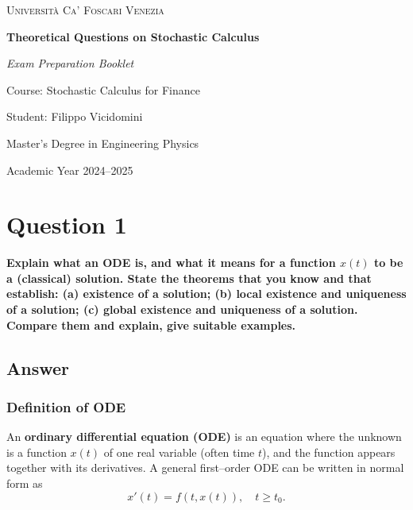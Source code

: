 \documentclass[12pt,a4paper]{book}
\theoremstyle{remark}
\begin{document}
\begin{titlepage}
    \centering
    
    {\scshape Università Ca' Foscari Venezia \par}
 
    \vspace{2cm}
    \vfill
    {\Huge\bfseries Theoretical Questions on Stochastic Calculus \par}
    \vspace{1.5cm}
    {\Large\itshape Exam Preparation Booklet\par}
    
    \vspace{2cm}
    {\Large Course: Stochastic Calculus for Finance \par}
    \vspace{0.5cm}
 
    
    \vfill
    
    {\large Student: Filippo Vicidomini \par}
    {\large Master’s Degree in Engineering Physics\par}
    
    \vfill
    
    {\large Academic Year 2024--2025 \par}
    
\end{titlepage}

\tableofcontents



\newpage
\section{Question 1}
\textbf{Explain what an ODE is, and what it means for a function $x(t)$ to be a (classical) solution. 
State the theorems that you know and that establish: (a) existence of a solution; (b) local existence and uniqueness of a solution; (c) global existence and uniqueness of a solution. 
Compare them and explain, give suitable examples.}

\subsection*{Answer}

\subsubsection*{Definition of ODE}
An \textbf{ordinary differential equation (ODE)} is an equation where the unknown is a function $x(t)$ of one real variable (often time $t$), and the function appears together with its derivatives.  
A general first–order ODE can be written in normal form as
\[
x'(t) = f(t,x(t)), \quad t \geq t_0.
\]
\end{document}
